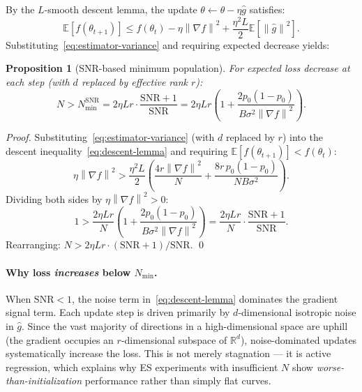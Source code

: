 \documentclass[11pt]{article}
\newtheorem{proposition}{Proposition}
\theoremstyle{definition}
\theoremstyle{remark}
\newcommand{\E}{\mathbb{E}}
\newcommand{\R}{\mathbb{R}}
\newcommand{\norm}[1]{\left\|#1\right\|}
\newcommand{\Nmin}{N_{\mathrm{min}}}
\newcommand{\SNR}{\mathrm{SNR}}
\begin{document}
By the $L$-smooth descent lemma, the update $\theta \leftarrow \theta - \eta\hat{g}$ satisfies:
\begin{equation}
  \E[f(\theta_{t+1})] \leq f(\theta_t) - \eta\norm{\nabla f}^2 + \frac{\eta^2 L}{2}\E\!\left[\norm{\hat{g}}^2\right].
  \label{eq:descent-lemma}
\end{equation}
Substituting~\eqref{eq:estimator-variance} and requiring expected decrease yields:

\begin{proposition}[SNR-based minimum population]
\label{prop:snr-nmin}
For expected loss decrease at each step (with $d$ replaced by effective rank $r$):
\begin{equation}
  N > \Nmin^{\mathrm{SNR}} = 2\eta Lr \cdot \frac{\SNR + 1}{\SNR} = 2\eta Lr\!\left(1 + \frac{2p_0(1-p_0)}{B\sigma^2\norm{\nabla f}^2}\right).
  \label{eq:snr-nmin}
\end{equation}
\end{proposition}

\begin{proof}
Substituting~\eqref{eq:estimator-variance} (with $d$ replaced by $r$) into the descent inequality~\eqref{eq:descent-lemma} and requiring $\E[f(\theta_{t+1})] < f(\theta_t)$:
\[
  \eta\norm{\nabla f}^2 > \frac{\eta^2 L}{2}\left(\frac{4r\norm{\nabla f}^2}{N} + \frac{8r\,p_0(1-p_0)}{NB\sigma^2}\right).
\]
Dividing both sides by $\eta\norm{\nabla f}^2 > 0$:
\[
  1 > \frac{2\eta Lr}{N}\left(1 + \frac{2p_0(1-p_0)}{B\sigma^2\norm{\nabla f}^2}\right) = \frac{2\eta Lr}{N}\cdot\frac{\SNR+1}{\SNR}.
\]
Rearranging: $N > 2\eta Lr \cdot (\SNR+1)/\SNR$. \qed
\end{proof}

\paragraph{Why loss \emph{increases} below $\Nmin$.}
When $\SNR < 1$, the noise term in~\eqref{eq:descent-lemma} dominates the gradient signal term. Each update step is driven primarily by $d$-dimensional isotropic noise in $\hat{g}$. Since the vast majority of directions in a high-dimensional space are uphill (the gradient occupies an $r$-dimensional subspace of $\R^d$), noise-dominated updates systematically increase the loss. This is not merely stagnation --- it is active regression, which explains why ES experiments with insufficient $N$ show \emph{worse-than-initialization} performance rather than simply flat curves.
\end{document}
